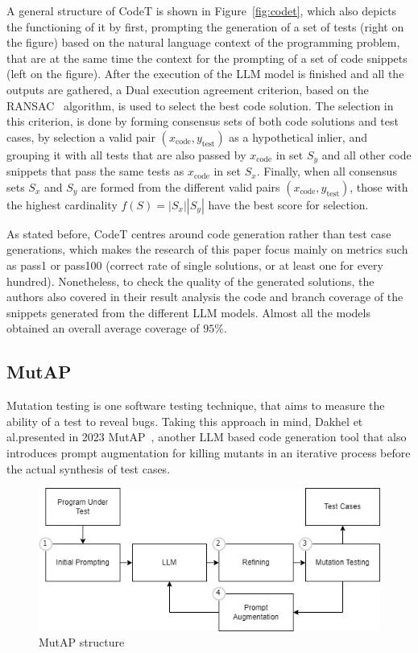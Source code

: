 \documentclass[%
  chapterprefix=false,%
  open=right,%
  twoside=true,%
  paper=a4,%
  logofile={Figures/logo.png},%
  thesistype=master,%
  UKenglish,%
]{se2thesis}
\begin{document}
A general structure of CodeT is shown in Figure~\ref{fig:codet}, which also depicts the functioning of it by first, prompting the generation of a set of tests (right on the figure) based on the natural language context of the programming problem, that are at the same time the context for the prompting of a set of code snippets (left on the figure).
After the execution of the LLM model is finished and all the outputs are gathered, a Dual execution agreement criterion, based on the RANSAC~\cite{DBLP:journals/cacm/FischlerB81} algorithm, is used to select the best code solution.
The selection in this criterion, is done by forming consensus sets of both code solutions and test cases, by selection a valid pair \((x_\text{code}, y_\text{test})\) as a hypothetical inlier, and grouping it with all tests that are also passed by \(x_\text{code}\) in set \(S_y\) and all other code snippets that pass the same tests as \(x_\text{code}\) in set \(S_x\).
Finally, when all consensus sets \(S_x\) and \(S_y\) are formed from the different valid pairs \((x_\text{code}, y_\text{test})\), those with the highest cardinality \(f(S) = |S_x||S_y|\) have the best score for selection.

As stated before, CodeT centres around code generation rather than test case generations, which makes the research of this paper focus mainly on metrics such as pass1 or pass100 (correct rate of single solutions, or at least one for every hundred).
Nonetheless, to check the quality of the generated solutions, the authors also covered in their result analysis the code and branch coverage of the snippets generated from the different LLM models.
Almost all the models obtained an overall average coverage of \(95\%\).
\subsection{MutAP}

Mutation testing is one software testing technique, that aims to measure the ability of a test to reveal bugs.
Taking this approach in mind, Dakhel et al.\@ presented in 2023 MutAP~\cite{DBLP:journals/corr/abs-2308-16557}, another LLM based code generation tool that also introduces prompt augmentation for killing mutants in an iterative process before the actual synthesis of test cases.

\begin{figure}[tb]
  \centering 
  \includegraphics[width=.99\textwidth]{Figures/mutap.png}
  \caption{MutAP structure}\label{fig:mutap}
\end{figure}
\end{document}
